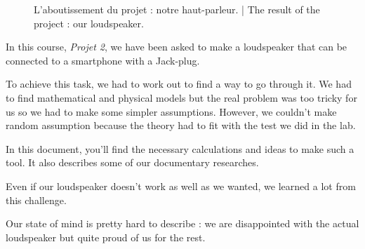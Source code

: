\begin{abstract-fr}
\begin{figure}[!htb]
	\caption{L'aboutissement du projet : notre haut-parleur. | The result of the project : our loudspeaker.}
\end{figure}

\end{abstract-fr}

\begin{abstract-en}

In this course, \textit{Projet 2}, we have been asked to make a loudspeaker that can be connected to a smartphone with a Jack-plug.

To achieve this task, we had to work out to find a way to go through it.
We had to find mathematical and physical models but the real problem was too tricky for us so we had to make some simpler assumptions.
However, we couldn't make random assumption because the theory had to fit with the test we did in the lab.

In this document, you'll find the necessary calculations and ideas to make such a tool. It also describes some
of our documentary researches.

Even if our loudspeaker doesn't work as well as we wanted, we learned a lot from this challenge. 

Our state of mind is pretty hard to describe : we are disappointed with the actual loudspeaker but quite proud of us for the rest.

\end{abstract-en}

